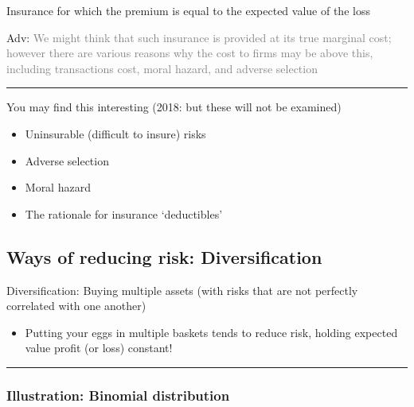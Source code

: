 \documentclass[]{article}
\providecommand{\tightlist}{%
  \setlength{\itemsep}{0pt}\setlength{\parskip}{0pt}}
\begin{document}
\begin{description}
\tightlist
\item[Fair insurance]
Insurance for which the premium is equal to the expected value of the loss
\end{description}

\textcolor{RawSienna}{Adv:} \textcolor{gray}{We might think that such insurance is provided at its true marginal cost; however there are various reasons why the cost to firms may be above this, including transactions cost, moral hazard, and adverse selection}

\begin{center}\rule{0.5\linewidth}{\linethickness}\end{center}

You may find this interesting (2018: but these will not be examined)

\begin{itemize}
\tightlist
\item
  Uninsurable (difficult to insure) risks
\item
  Adverse selection
\item
  Moral hazard
\item
  The rationale for insurance `deductibles'
\end{itemize}

\hypertarget{ways-of-reducing-risk-diversification}{%
\subsection{Ways of reducing risk: Diversification}\label{ways-of-reducing-risk-diversification}}

Diversification: Buying multiple assets (with risks that are not perfectly correlated with one another)

\begin{itemize}
\tightlist
\item
  Putting your eggs in multiple baskets tends to reduce risk, holding expected value profit (or loss) constant!
\end{itemize}

\begin{center}\rule{0.5\linewidth}{\linethickness}\end{center}

\hypertarget{illustration-binomial-distribution}{%
\subsubsection{Illustration: Binomial distribution}\label{illustration-binomial-distribution}}
\end{document}
